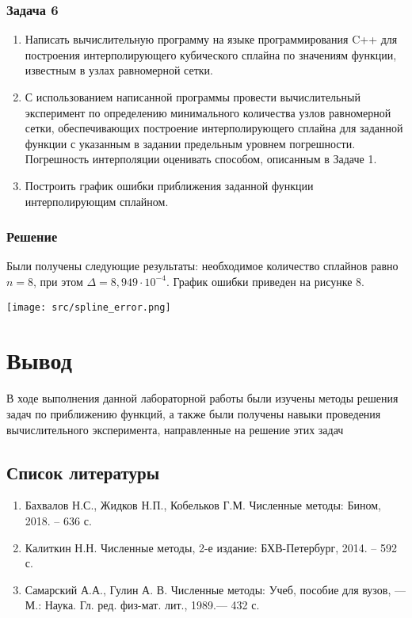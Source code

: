 \documentclass[a4paper, fontsize=14pt]{article}
\begin{document}
    \subsubsection*{Задача 6}
    \begin{enumerate}
        \item Написать вычислительную программу на языке программирования C++ для построения интерполирующего кубического сплайна по значениям функции, известным в узлах равномерной сетки. 
        \item С использованием написанной программы провести вычислительный эксперимент по определению минимального количества узлов равномерной сетки, обеспечивающих построение интерполирующего сплайна для заданной функции с указанным в задании предельным уровнем погрешности. Погрешность интерполяции оценивать способом, описанным в Задаче 1.
        \item Построить график ошибки приближения заданной функции интерполирующим сплайном.
    \end{enumerate}
    
    \subsubsection*{Решение}
    Были получены следующие результаты: необходимое количество сплайнов равно $n=8$, при этом $\Delta = 8,949 \cdot 10^{-4}$. График ошибки приведен на рисунке 8.

    \begin{center}
        \texttt{[image: src/spline\_error.png]}
    \end{center}
    \newpage
\section*{{Вывод}}
В ходе выполнения данной лабораторной работы были изучены методы
решения задач по приближению функций, а также были получены навыки
проведения вычислительного эксперимента, направленные на решение этих
задач
\newpage
\subsection*{Список литературы}
\begin{enumerate}
    \item Бахвалов Н.С., Жидков Н.П., Кобельков Г.М. Численные методы: Бином, 2018. – 636 с. 
    \item Калиткин Н.Н. Численные методы, 2-е издание: БХВ-Петербург, 2014. – 592 с.
    \item Самарский А.А., Гулин А. В. Численные методы: Учеб, пособие для вузов, — М.: Наука. Гл. ред. физ-мат. лит., 1989.— 432 с.
\end{enumerate}
\newpage
\end{document}
